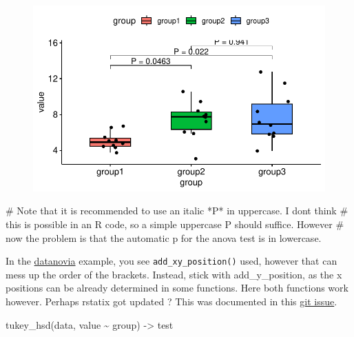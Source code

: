 \documentclass[
  letterpaper,
  DIV=11,
  numbers=noendperiod]{scrreprt}
\newenvironment{Shaded}{\begin{snugshade}}{\end{snugshade}}
\newcommand{\CommentTok}[1]{\textcolor[rgb]{0.37,0.37,0.37}{#1}}
\newcommand{\FunctionTok}[1]{\textcolor[rgb]{0.28,0.35,0.67}{#1}}
\newcommand{\NormalTok}[1]{\textcolor[rgb]{0.00,0.23,0.31}{#1}}
\newcommand{\OtherTok}[1]{\textcolor[rgb]{0.00,0.23,0.31}{#1}}
\newcommand{\SpecialCharTok}[1]{\textcolor[rgb]{0.37,0.37,0.37}{#1}}
\begin{document}
\begin{figure}[H]

{\centering \includegraphics{./ggplot2_files/figure-pdf/unnamed-chunk-4-1.pdf}

}

\end{figure}

\begin{Shaded}
\begin{Highlighting}[]
\CommentTok{\# Note that it is recommended to use an italic *P* in uppercase. I don\textquotesingle{}t think}
\CommentTok{\# this is possible in an R code, so a simple uppercase P should suffice. However}
\CommentTok{\# now the problem is that the automatic p for the anova test is in lowercase.}
\end{Highlighting}
\end{Shaded}

In the
\href{https://www.datanovia.com/en/blog/ggpubr-how-to-add-p-values-generated-elsewhere-to-a-ggplot/}{datanovia}
example, you see \texttt{add\_xy\_position()} used, however that can
mess up the order of the brackets. Instead, stick with add\_y\_position,
as the x positions can be already determined in some functions. Here
both functions work however. Perhaps rstatix got updated ? This was
documented in this
\href{https://github.com/kassambara/ggpubr/issues/477\#issue-1289858095}{git
issue}.

\begin{Shaded}
\begin{Highlighting}[]
\FunctionTok{tukey\_hsd}\NormalTok{(data, value }\SpecialCharTok{\textasciitilde{}}\NormalTok{ group) }\OtherTok{{-}\textgreater{}}\NormalTok{ test}
\end{Highlighting}
\end{Shaded}
\end{document}
